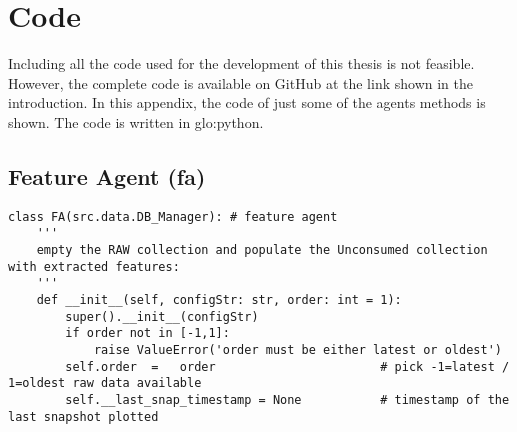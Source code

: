\chapter{Code}
\label{ch:code}
Including all the code used for the development of this thesis is not feasible. However, the complete code is available on GitHub at the link shown in the introduction. In this appendix, the code of just some of the agents methods is shown. The code is written in \gls{glo:python}.
\section{Feature Agent (\gls{fa})}
\label{sec:fa}
\begin{verbatim}
class FA(src.data.DB_Manager): # feature agent
    '''
    empty the RAW collection and populate the Unconsumed collection with extracted features:
    '''
    def __init__(self, configStr: str, order: int = 1):
        super().__init__(configStr)
        if order not in [-1,1]:
            raise ValueError('order must be either latest or oldest')
        self.order  =   order                       # pick -1=latest / 1=oldest raw data available
        self.__last_snap_timestamp = None           # timestamp of the last snapshot plotted
    

\end{verbatim}
